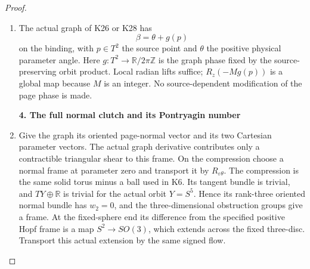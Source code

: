 \begin{proof}
\begin{enumerate}[label=\arabic*.]
\item The actual graph of K26 or K28 has
\[
                         \beta=\theta+g(p)
 \tag{K30.16}
\]
on the binding, with \(p\in T^2\) the source point and
\(\theta\) the positive physical parameter angle.
Here \(g:T^2\to\mathbb R/2\pi\mathbb Z\) is the graph phase
fixed by the source-preserving orbit product. Local radian
lifts suffice; \(R_z(-Mg(p))\) is a global map because \(M\)
is an integer. No source-dependent modification of the
page phase is made.

\par

\medskip\noindent\textbf{4. The full normal clutch and its Pontryagin number}

\par\nobreak

\item Give the graph its oriented page-normal vector and its two
Cartesian parameter vectors. The actual graph derivative
contributes only a contractible triangular shear to this
frame. On the compression choose a normal frame at parameter
zero and transport it by \(R_{\varepsilon\theta}\).
The compression is the same solid torus minus a ball used
in K6. Its tangent bundle is trivial, and
\(TY\oplus\mathbb R\) is trivial for the actual orbit
\(Y=S^5\). Hence its rank-three oriented normal bundle has
\(w_2=0\), and the three-dimensional obstruction groups
give a frame. At the fixed-sphere end its difference from
the specified positive Hopf frame is a map
\(S^2\to SO(3)\), which extends across the fixed three-disc.
Transport this actual extension by the same signed flow.


\end{enumerate}
\end{proof}
